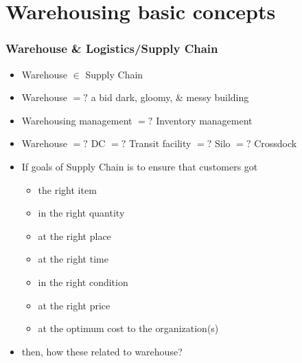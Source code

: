 \documentclass[10pt,handout,notes=show]{beamer}
\begin{document}
\section[Warehouse 101]{Warehousing basic concepts}
\begin{frame}
  \frametitle{Warehouse \& Logistics/Supply Chain}

    \begin{itemize}
      \item Warehouse $\in$ Supply Chain
      \item Warehouse $=\!\!\!?$ a bid dark, gloomy, \& messy building
      \item Warehousing management $=\!\!\!?$ Inventory management
      \item Warehouse $=\!\!\!?$ DC $=\!\!\!?$ Transit facility $=\!\!\!?$ Silo $=\!\!\!?$ Crossdock
      \item If goals of Supply Chain is to ensure that \alert{customers} got
      \begin{itemize}
      \item[] the right \alert{item}
      \item[] in the right \alert{quantity}
      \item[] at the right \alert{place}
      \item[] at the right \alert{time}
      \item[] in the right \alert{condition}
      \item[] at the right \alert{price}
      \item[] at the optimum cost to the \alert{organization(s)}
      \end{itemize}
      \item[] then, how these related to \alert{warehouse}?
    \end{itemize}

\end{frame}
\end{document}
